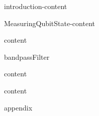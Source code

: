 







\maketitle

\begin{frontmatter}













\cleardoublepage
{}
\begin{singlespace}
\tableofcontents
\end{singlespace}

\end{frontmatter}

\pagestyle{plain} %

{introduction-content}

{MeasuringQubitState-content}

{content}

{bandpassFilter}

{content}

{content}

{appendix}





